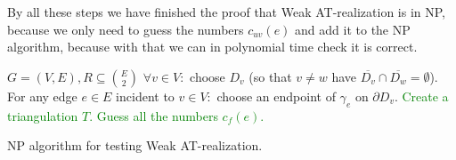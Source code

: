 By all these steps we have finished the proof that Weak AT-realization is in NP, because we only need to guess the numbers $c_{uv}(e)$ and add it to the NP algorithm, because with that we can in polynomial time check it is correct.

\begin{algorithm}[!ht]
	\begin{algorithmic}[1]
		\Require $G = (V,E), R \subseteq \binom{E}{2}$
		\State $\forall v \in V:$ choose $D_v$ (so that $v \neq w$ have $\overline{D_v} \cap \overline{D_w} = \emptyset$).
		\State For any edge $e \in E$ incident to $v \in V:$ choose an endpoint of $\gamma_e$ on $\partial D_v$.
		\State \textcolor{Green}{Create a triangulation $T$.}
		\State \textcolor{Green}{Guess all the numbers $c_{f}(e)$.}
	\end{algorithmic}
	\caption{NP algorithm for testing Weak AT-realization.}
\end{algorithm}